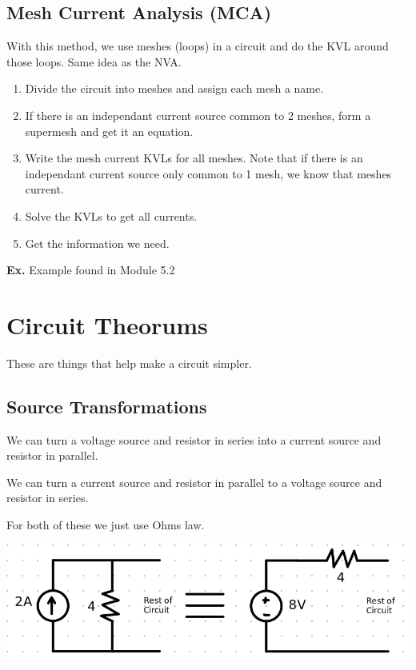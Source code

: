 \documentclass[12pt,letterpaper]{article} \usepackage{amsmath} \usepackage{graphicx} \usepackage[margin=1in]{geometry} \usepackage{longtable}  \usepackage{amssymb}
\begin{document}
	\subsection{Mesh Current Analysis (MCA)}
	With this method, we use meshes (loops) in a circuit and do the KVL around those loops. Same idea as the NVA. 
	
	\begin{enumerate}[noitemsep]
		\item Divide the circuit into meshes and assign each mesh a name.
		\item If there is an independant current source common to 2 meshes, form a supermesh and get it an equation. 
		\item Write the mesh current KVLs for all meshes. Note that if there is an independant current source only common to 1 mesh, we know that meshes current.
		\item Solve the KVLs to get all currents.
		\item Get the information we need. 
	\end{enumerate}

	\begin{mdframed}
		\textbf{Ex. } Example found in Module 5.2
	\end{mdframed}
	
	\section{Circuit Theorums}
	These are things that help make a circuit simpler. 
	
	\subsection{Source Transformations}
	We can turn a voltage source and resistor in series into a current source and resistor in parallel.
	
	We can turn a current source and resistor in parallel to a voltage source and resistor in series.
	
	For both of these we just use Ohms law. 
	\begin{center}
		\includegraphics[width=0.7\linewidth]{transSource}
	\end{center}
	
\end{document}
